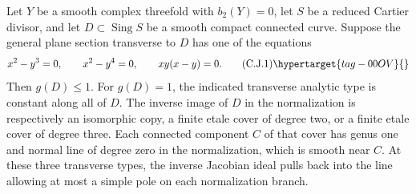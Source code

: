 \begin{proposition}\hypertarget{tag-01FJ}{}\label{cdp:st:C2d}


Let $Y$ be a smooth complex threefold with $b_2(Y)=0$, let $S$ be a reduced Cartier divisor, and let $D\subset\operatorname{Sing}S$ be a smooth compact connected curve. Suppose the general plane section transverse to $D$ has one of the equations
\[
 x^2-y^3=0,\qquad x^2-y^4=0,\qquad xy(x-y)=0.
 \tag{C.J.1}\hypertarget{tag-00OV}{}\label{cdp:eq:C.J.1}
\]
Then $g(D)\le1$. For $g(D)=1$, the indicated transverse analytic type is constant along all of $D$. The inverse image of $D$ in the normalization is respectively an isomorphic copy, a finite etale cover of degree two, or a finite etale cover of degree three. Each connected component $C$ of that cover has genus one and normal line of degree zero in the normalization, which is smooth near $C$. At these three transverse types, the inverse Jacobian ideal pulls back into the line allowing at most a simple pole on each normalization branch.
\end{proposition}

